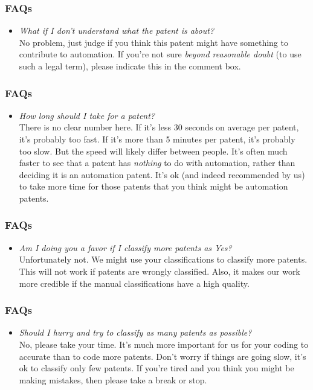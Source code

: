 \documentclass[10pt]{beamer}
\begin{document}
\begin{frame}\frametitle{FAQs}
	\begin{itemize}	
	\item \textit{What if I don't understand what the patent is about?}\\[0.1cm]
	No problem, just judge if you think this patent might have something to contribute to automation. If you're not sure \textit{beyond reasonable doubt} (to use such a legal term), please indicate this in the comment box.
	\end{itemize}
\end{frame}
	
\begin{frame}\frametitle{FAQs}
	\begin{itemize}	
	\item \textit{How long should I take for a patent?}\\[0.1cm]
	There is no clear number here. If it's less 30 seconds on average per patent, it's probably too fast. If it's more than 5 minutes per patent, it's probably too slow. But the speed will likely differ between people. It's often much faster to see that a patent has \textit{nothing} to do with automation, rather than deciding it is an automation patent. It's ok (and indeed recommended by us) to take more time for those patents that you think might be automation patents.
	\end{itemize}
\end{frame}

\begin{frame}\frametitle{FAQs}
	\begin{itemize}	
	\item \textit{Am I doing you a favor if I classify more patents as Yes?}\\[0.1cm]
	Unfortunately not. We might use your classifications to classify more patents. This will not work if patents are wrongly classified. Also, it makes our work more credible if the manual classifications have a high quality.
	\end{itemize}
\end{frame}
	
\begin{frame}\frametitle{FAQs}
	\begin{itemize}	
	\item \textit{Should I hurry and try to classify as many patents as possible?}\\[0.1cm]
	No, please take your time. It's much more important for us for your coding to accurate than to code more patents. Don't worry if things are going slow, it's ok to classify only few patents. If you're tired and you think you might be making mistakes, then please take a break or stop.
	\end{itemize}
\end{frame}
\end{document}
